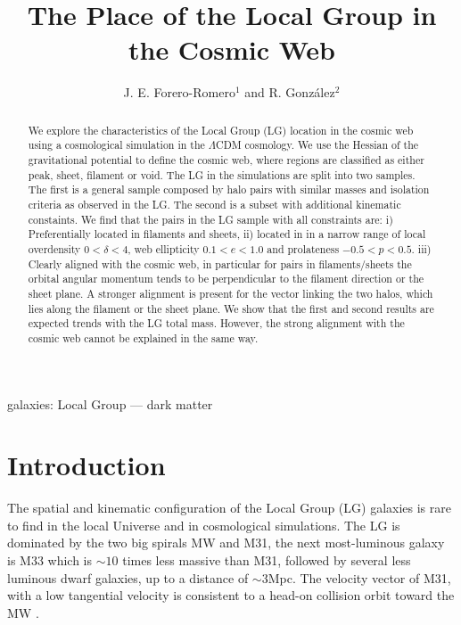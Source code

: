 \documentclass{emulateapj}
\newcommand{\mpc}{\rm{Mpc}}
\begin{document}
\title{The Place of the Local Group in the Cosmic Web}
\author{J. E. Forero-Romero$^1$ and R. Gonz\'alez$^2$}


\begin{abstract}
We explore the characteristics of the Local Group (LG)
location in the cosmic web using a cosmological simulation in the
$\Lambda$CDM cosmology.  We use the Hessian of the gravitational
potential to define the cosmic web, where regions are classified as
either peak, sheet, filament or void.  The LG in the simulations are
split into two samples.  The first is a general sample composed by
halo pairs with similar masses and isolation criteria as observed in
the LG.  The second is a subset with additional kinematic constaints.
We find that the pairs in the LG sample with all constraints are: i)
Preferentially located in filaments and sheets, ii) located in in a
narrow range of local overdensity $0<\delta<4$, web ellipticity
$0.1<e<1.0$ and prolateness $-0.5<p<0.5$.  iii) Clearly aligned with
the cosmic web, in particular for pairs in filaments/sheets the
orbital angular momentum tends to be perpendicular to the filament
direction or the sheet plane. A stronger alignment is present for the
vector linking the two halos, which lies along the filament or the
sheet plane.  We show that the first and second results are expected
trends with the LG total mass.  However, the strong alignment with the
cosmic web cannot be explained in the same way.


\end{abstract}

\begin{keywords}
{galaxies: Local Group --- dark matter}
\end{keywords}


\section{Introduction}
\label{sec:intro}

The spatial and kinematic configuration of the Local Group
(LG) galaxies is rare to find in the local Universe and in cosmological
simulations. 
The LG is dominated by the two big spirals MW and M31, the next
most-luminous galaxy is M33 which is $\sim 10$ times less massive than
M31, followed by several less luminous dwarf galaxies, up to a
distance of $\sim 3$\mpc.   
The velocity vector of M31, with a low
tangential velocity is consistent to a head-on collision orbit toward
the MW
\citep{2008MNRAS.386..461C,2012ApJ...753....8V,2012ApJ...753....7S}.   
\end{document}
